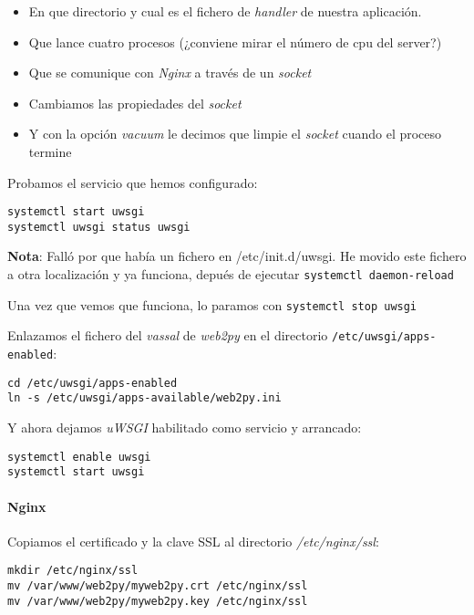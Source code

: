 \documentclass[12pt,spanish,]{article}
\providecommand{\tightlist}{%
  \setlength{\itemsep}{0pt}\setlength{\parskip}{0pt}}
\let\oldparagraph\paragraph
\renewcommand{\paragraph}[1]{\oldparagraph{#1}\mbox{}}
\begin{document}
\begin{itemize}
\tightlist
\item
  En que directorio y cual es el fichero de \emph{handler} de nuestra
  aplicación.
\item
  Que lance cuatro procesos (¿conviene mirar el número de cpu del
  server?)
\item
  Que se comunique con \emph{Nginx} a través de un \emph{socket}
\item
  Cambiamos las propiedades del \emph{socket}
\item
  Y con la opción \emph{vacuum} le decimos que limpie el \emph{socket}
  cuando el proceso termine
\end{itemize}

Probamos el servicio que hemos configurado:

\begin{verbatim}
systemctl start uwsgi
systemctl uwsgi status uwsgi
\end{verbatim}

\textbf{Nota}: Falló por que había un fichero en /etc/init.d/uwsgi. He
movido este fichero a otra localización y ya funciona, depués de
ejecutar \texttt{systemctl\ daemon-reload}

Una vez que vemos que funciona, lo paramos con
\texttt{systemctl\ stop\ uwsgi}

Enlazamos el fichero del \emph{vassal} de \emph{web2py} en el directorio
\texttt{/etc/uwsgi/apps-enabled}:

\begin{verbatim}
cd /etc/uwsgi/apps-enabled
ln -s /etc/uwsgi/apps-available/web2py.ini
\end{verbatim}

Y ahora dejamos \emph{uWSGI} habilitado como servicio y arrancado:

\begin{verbatim}
systemctl enable uwsgi
systemctl start uwsgi
\end{verbatim}

\paragraph{Nginx}\label{nginx}

Copiamos el certificado y la clave SSL al directorio
\emph{/etc/nginx/ssl}:

\begin{verbatim}
mkdir /etc/nginx/ssl
mv /var/www/web2py/myweb2py.crt /etc/nginx/ssl
mv /var/www/web2py/myweb2py.key /etc/nginx/ssl
\end{verbatim}
\end{document}

